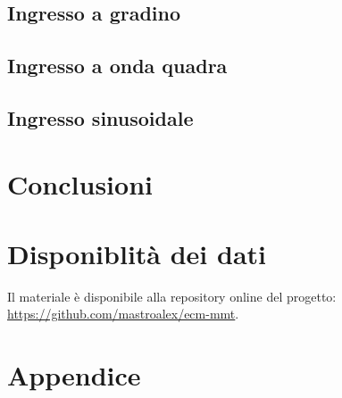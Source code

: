 \subsection{Ingresso a gradino}




\textcolor{blue}{\lipsum[1-2]}

\subsection{Ingresso a onda quadra}




\textcolor{blue}{\lipsum[1-2]}

\subsection{Ingresso sinusoidale}




\textcolor{blue}{\lipsum[1-2]}



\section{Conclusioni}

\textcolor{blue}{\lipsum[1-2]}


\raggedbottom


\raggedbottom
\pagebreak
\section*{Disponiblità dei dati}

Il materiale è disponibile alla repository online del progetto: \url{https://github.com/mastroalex/ecm-mmt}.

\printbibliography[title=Riferimenti]

\clearpage
\onecolumn
\section*{Appendice}

